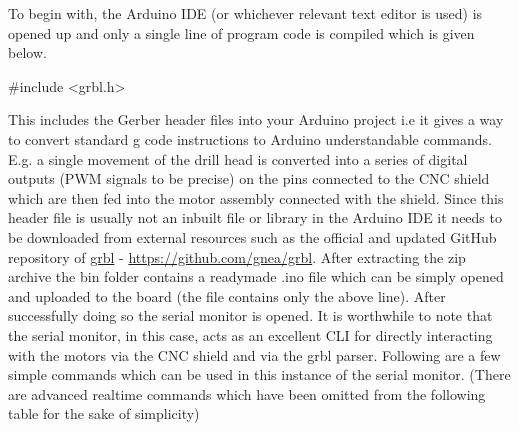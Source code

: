 To begin with, the Arduino IDE (or whichever relevant text editor is used) is opened up and only a single line of program code is compiled which is given below.

 {\selectfont \#include <grbl.h>}

This includes the Gerber header files into your Arduino project i.e it gives a way to convert standard g code instructions to Arduino understandable commands. E.g. a single movement of the drill head is converted into a series of digital outputs (PWM signals to be precise) on the pins connected to the CNC shield which are then fed into the motor assembly connected with the shield. Since this header file is usually not an inbuilt file or library in the Arduino IDE it needs to be downloaded from external resources such as the official and updated GitHub repository of \href{https://github.com/gnea/grbl}{grbl} - \url{https://github.com/gnea/grbl}. After extracting the zip archive the bin folder contains a readymade .ino file which can be simply opened and uploaded to the board (the file contains only the above line). After successfully doing so the serial monitor is opened. It is worthwhile to note that the serial monitor, in this case, acts as an excellent CLI for directly interacting with the motors via the CNC shield and via the grbl parser. Following are a few simple commands which can be used in this instance of the serial monitor. (There are advanced realtime commands which have been omitted from the following table for the sake of simplicity) \par


